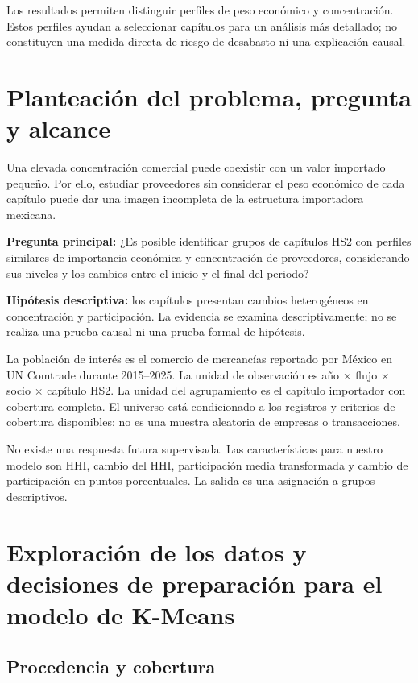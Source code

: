 \documentclass[
  spanish,
  10pt,
]{article}
\begin{document}
Los resultados permiten distinguir perfiles de peso económico y
concentración. Estos perfiles ayudan a seleccionar capítulos para un
análisis más detallado; no constituyen una medida directa de riesgo de
desabasto ni una explicación causal.

\section{Planteación del problema, pregunta y
alcance}\label{planteaciuxf3n-del-problema-pregunta-y-alcance}

Una elevada concentración comercial puede coexistir con un valor
importado pequeño. Por ello, estudiar proveedores sin considerar el peso
económico de cada capítulo puede dar una imagen incompleta de la
estructura importadora mexicana.

\textbf{Pregunta principal:} ¿Es posible identificar grupos de capítulos
HS2 con perfiles similares de importancia económica y concentración de
proveedores, considerando sus niveles y los cambios entre el inicio y el
final del periodo?

\textbf{Hipótesis descriptiva:} los capítulos presentan cambios
heterogéneos en concentración y participación. La evidencia se examina
descriptivamente; no se realiza una prueba causal ni una prueba formal
de hipótesis.

La población de interés es el comercio de mercancías reportado por
México en UN Comtrade durante 2015--2025. La unidad de observación es
año × flujo × socio × capítulo HS2. La unidad del agrupamiento es el
capítulo importador con cobertura completa. El universo está
condicionado a los registros y criterios de cobertura disponibles; no es
una muestra aleatoria de empresas o transacciones.

No existe una respuesta futura supervisada. Las características para
nuestro modelo son HHI, cambio del HHI, participación media transformada
y cambio de participación en puntos porcentuales. La salida es una
asignación a grupos descriptivos.

\section{Exploración de los datos y decisiones de preparación para el
modelo de
K-Means}\label{exploraciuxf3n-de-los-datos-y-decisiones-de-preparaciuxf3n-para-el-modelo-de-k-means}

\subsection{Procedencia y cobertura}\label{procedencia-y-cobertura}
\end{document}
